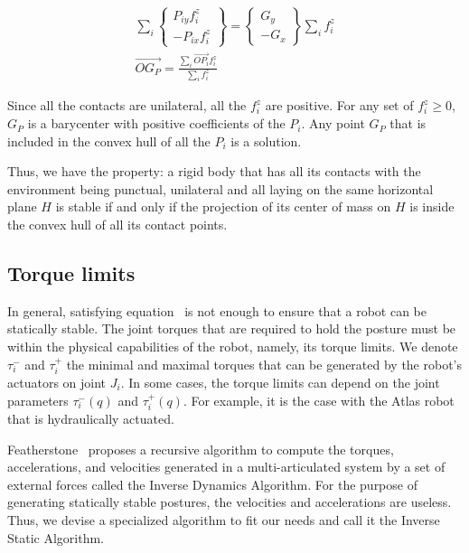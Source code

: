\begin{align}
\sum\limits_i \left\{\begin{array}{r} P_{iy}f_i^z\\-P_{ix}f_i^z\end{array}\right\}
= \left\{\begin{array}{r} G_{y}\\-G_{x}\end{array}\right\} \sum\limits_i f_i^z\\
  \overrightarrow{OG_P} = \frac{\sum\limits_i \overrightarrow{OP_i} f_i^z}{\sum\limits_i f_i^z}
\end{align}

Since all the contacts are unilateral, all the $f_i^z$ are positive.
For any set of $f_i^z\geq0$, $G_P$ is a barycenter with positive coefficients of the $P_i$.
Any point $G_P$ that is included in the convex hull of all the $P_i$ is a solution.

Thus, we have the property: a rigid body that has all its contacts with the environment being punctual, unilateral and all laying on the same horizontal plane $H$ is stable if and only if the projection of its center of mass on $H$ is inside the convex hull of all its contact points.



\subsection{Torque limits}
\label{sub:torque_limits}


In general, satisfying equation~ is not enough to ensure that a robot can be statically stable.
The joint torques that are required to hold the posture must be within the physical capabilities of the robot, namely, its torque limits.
We denote $\tau_i^-$ and $\tau_i^+$ the minimal and maximal torques that can be generated by the robot's actuators on joint $J_i$.
In some cases, the torque limits can depend on the joint parameters $\tau_i^-(q)$ and $\tau_i^+(q)$.
For example, it is the case with the Atlas robot that is hydraulically actuated.

Featherstone~\cite{featherstone:book:2007} proposes a recursive algorithm to compute the torques, accelerations, and velocities generated in a multi-articulated system by a set of external forces called the Inverse Dynamics Algorithm.
For the purpose of generating statically stable postures, the velocities and accelerations are useless.
Thus, we devise a specialized algorithm to fit our needs and call it the Inverse Static Algorithm.

